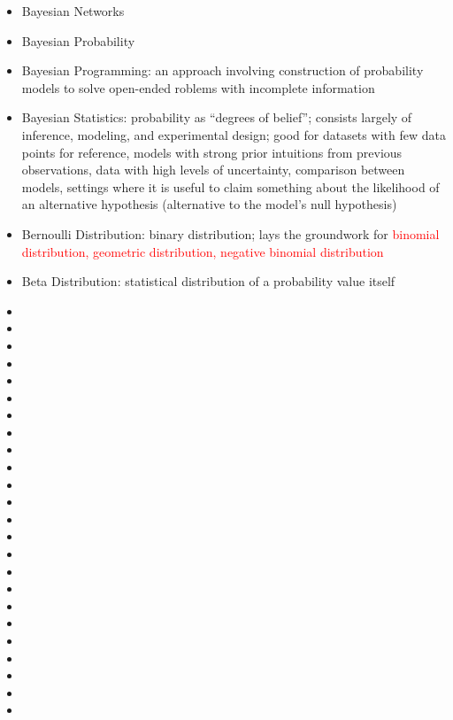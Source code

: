 \documentclass[a4paper]{article}
\newcommand{\cmark}{\ding{51}}%
\newcommand{\done}{\rlap{$\square$}{\raisebox{2pt}{\large\hspace{1pt}\cmark}}\hspace{-2.5pt}}
\newcommand{\followup}[1]{\textcolor{red}{ #1 }}
\begin{document}
\begin{itemize}
    \item [\done] Bayesian Networks
    \item [\done] Bayesian Probability
    \item [\done] Bayesian Programming: an approach involving construction of probability models to solve open-ended roblems with incomplete information
    \item [\done] Bayesian Statistics: probability as ``degrees of belief''; consists largely of inference, modeling, and experimental design; good for datasets with few data points for reference, models with strong prior intuitions from previous observations, data with high levels of uncertainty, comparison between models, settings where it is useful to claim something about the likelihood of an alternative hypothesis (alternative to the model's null hypothesis)
    \item [\done] Bernoulli Distribution: binary distribution; lays the groundwork for \followup{binomial distribution, geometric distribution, negative binomial distribution}
    \item [\done] Beta Distribution: statistical distribution of a probability value itself
    \item [\done] 
    \item [\done] 
    \item [\done] 
    \item [\done] 
    \item [\done] 
    \item [\done] 
    \item [\done] 
    \item [\done] 
    \item [\done] 
    \item [\done] 
    \item [\done] 
    \item [\done] 
    \item [\done] 
    \item [\done] 
    \item [\done] 
    \item [\done] 
    \item [\done] 
    \item [\done] 
    \item [\done] 
    \item [\done] 
    \item [\done] 
    \item [\done] 
    \item [\done] 
    \item [\done] 

\end{itemize}
\end{document}
